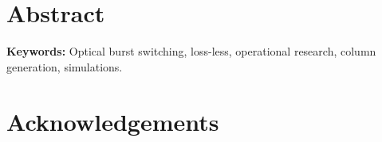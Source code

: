 \chapter*{Abstract}

\lipsum[0-4]


\vspace{3mm}
\noindent
\textbf{Keywords:}
Optical burst switching, loss-less, operational research, column generation, simulations.







\newpage
\chapter*{Acknowledgements}

\lipsum[2-4]